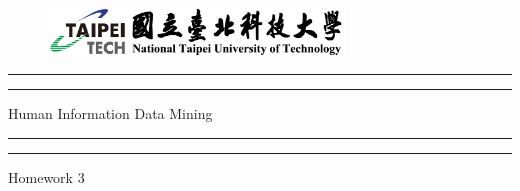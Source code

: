\begin{titlepage} %

	\centering %
	
	\scshape %
	
	\vspace*{\baselineskip} %

	\begin{figure}

        \centering

        \includegraphics[width=0.7\textwidth]{../output/logo}

    \end{figure}
	
	
	\rule{\textwidth}{1.6pt}\vspace*{-\baselineskip}\vspace*{2pt} %
	\rule{\textwidth}{0.4pt} %
	
	\vspace{0.75\baselineskip} %
	
	{\LARGE Human Information Data Mining} %
	
	\vspace{0.75\baselineskip} %
	
	\rule{\textwidth}{0.4pt}\vspace*{-\baselineskip}\vspace{3.2pt} %
	\rule{\textwidth}{1.6pt} %
	
	\vspace{2\baselineskip} %
	
	
	Homework 3 %
	
	\vspace*{3\baselineskip} %
	

\end{titlepage}
